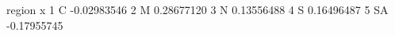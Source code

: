 \begin{Schunk}
\begin{Soutput}
  region           x
1      C -0.02983546
2      M  0.28677120
3      N  0.13556488
4      S  0.16496487
5     SA -0.17955745
\end{Soutput}
\end{Schunk}
